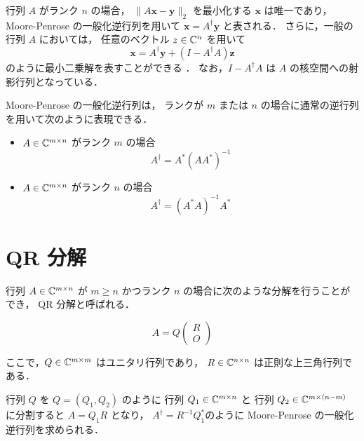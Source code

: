 行列 $A$ がランク $n$ の場合，
$\|A \bm{x} - \bm{y}\|_2$ を最小化する $\bm{x}$ は唯一であり，
Moore-Penrose の一般化逆行列を用いて
$\bm{x} = A^\dagger \bm{y}$ と表される．
さらに，一般の行列 $A$ においては，
任意のベクトル $z \in \mathbb{C}^n$ を用いて
\begin{equation}
    \bm{x} = A^\dagger \bm{y} + (I - A^\dagger A) \bm{z}
    \label{eq:matrix-computation_moore-penrose_general-least-squares-solution}
\end{equation}
のように最小二乗解を表すことができる \cite[定理2.3.1]{Rao1971}．
なお，$I - A^\dagger A$ は $A$ の核空間への射影行列となっている．

Moore-Penrose の一般化逆行列は，
ランクが $m$ または $n$ の場合に通常の逆行列を用いて次のように表現できる．

\begin{itemize}
    \item $A \in \mathbb{C}^{m \times n}$ がランク $m$ の場合
          \begin{equation}
              A^\dagger = A^* (A A^*)^{-1}
          \end{equation}
    \item $A \in \mathbb{C}^{m \times n}$ がランク $n$ の場合
          \begin{equation}
              A^\dagger = (A^* A)^{-1} A^*
          \end{equation}
\end{itemize}

\section{QR 分解}

行列 $A \in \mathbb{C}^{m \times n}$ が
$m \ge n$ かつランク $n$ の場合に次のような分解を行うことができ，
QR 分解と呼ばれる．

\begin{equation}
    A = Q
    \begin{pmatrix}
        R \\ O
    \end{pmatrix}
\end{equation}

ここで，$Q \in \mathbb{C}^{m \times m}$ はユニタリ行列であり，
$R \in \mathbb{C}^{n \times n}$ は正則な上三角行列である．

行列 $Q$ を $Q = (Q_1, Q_2)$ のように
行列 $Q_1 \in \mathbb{C}^{m \times n}$ と
行列 $Q_2 \in \mathbb{C}^{m \times (n-m)}$ に分割すると
$A = Q_1 R$ となり，
$A^\dagger = R^{-1} Q_1^*$のように
Moore-Penrose の一般化逆行列を求められる．

